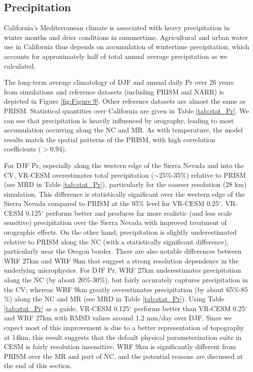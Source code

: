 \documentclass[draft,ms]{agutex}   %
\begin{document}
\begin{article}
\subsection{Precipitation}

California's Mediterranean climate is associated with heavy precipitation in winter months and drier conditions in summertime.  Agricultural and urban water use in California thus depends on accumulation of wintertime precipitation, which accounts for approximately half of total annual average precipitation as we calculated.


The long-term average climatology of DJF and annual daily Pr over 26 years from simulations and reference datasets (including PRISM and NARR) is depicted in Figure \ref{fig:Figure 9}. Other reference datasets are almost the same as PRISM. Statistical quantities over California are given in Table \ref{tab:stat_Pr}. We can see that precipitation is heavily influenced by orography, leading to most accumulation occurring along the NC and MR. As with temperature, the model results match the spatial patterns of the PRISM, with high correlation coefficients ($>$0.94).

For DJF Pr, especially along the western edge of the Sierra Nevada and into the CV, VR-CESM overestimates total precipitation ($\sim$25$\%$-35$\%$) relative to PRISM (see MRD in Table \ref{tab:stat_Pr}), particularly for the coarser resolution (28 km) simulation. This difference is statistically significant over the western edge of the Sierra Nevada compared to PRISM at the 95\% level for VR-CESM 0.25$^\circ$. VR-CESM 0.125$^\circ$ performs better and produces far more realistic (and less scale sensitive) precipitation over the Sierra Nevada with improved treatment of orographic effects. On the other hand, precipitation is slightly underestimated relative to PRISM along the NC (with a statistically significant difference), particularly near the Oregon border. There are also notable differences between WRF 27km and WRF 9km that suggest a strong resolution dependence in the underlying microphysics. For DJF Pr, WRF 27km underestimates precipitation along the NC (by about 20$\%$-30$\%$), but fairly accurately captures precipitation in the CV; whereas WRF 9km greatly overestimates precipitation (by about 65$\%$-85$\%$) along the NC and MR (see MRD in Table \ref{tab:stat_Pr}). Using Table \ref{tab:stat_Pr} as a guide, VR-CESM 0.125$^\circ$ performs  better than VR-CESM 0.25$^\circ$ and WRF 27km with RMSD values around 1.2 mm$/$day over DJF. Since we expect most of this improvement is due to a better representation of topography at 14km, this result suggests that the default physical parameterization suite in CESM is fairly resolution insensitive. WRF 9km is significantly different from PRISM over the MR and part of NC, and the potential reasons are discussed at the end of this section. 


\end{article}
\end{document}
